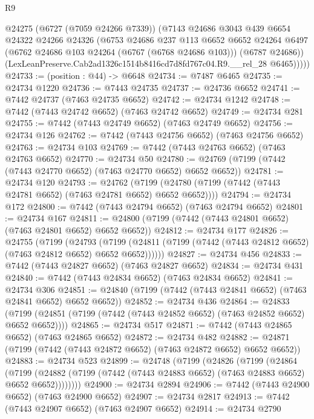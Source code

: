 \begin{lexlean}{R9}
\begin{coremodule}
          @24275
          (@6727 (@7059 @24266 @7339))
          (@7143
            @24686
            @3043
            @439
            @6654
            @24322
            @24266
            @24326
            (@6753
              @24686
              @237
              @113
              @6652
              @6652
              @24264
              @6497
              (@6762 @24686 @103 @24264 (@6767 (@6768 @24686 @103)))
              (@6787 @24686))
            (LexLeanPreserve.Cab2ad1326c1514b8416cd7d8fd767c04.R9.__rel_28 @6465)))))
@24733 := (position : @44) -> @6648
@24734 := @7487 @6465
@24735 := @24734 @1220
@24736 := @7443 @24735
@24737 := @24736 @6652
@24741 := @7442 @24737 (@7463 @24735 @6652)
@24742 := @24734 @1242
@24748 := @7442 (@7443 @24742 @6652) (@7463 @24742 @6652)
@24749 := @24734 @281
@24755 := @7442 (@7443 @24749 @6652) (@7463 @24749 @6652)
@24756 := @24734 @126
@24762 := @7442 (@7443 @24756 @6652) (@7463 @24756 @6652)
@24763 := @24734 @103
@24769 := @7442 (@7443 @24763 @6652) (@7463 @24763 @6652)
@24770 := @24734 @50
@24780 := @24769 (@7199 (@7442 (@7443 @24770 @6652) (@7463 @24770 @6652) @6652 @6652))
@24781 := @24734 @120
@24793 := @24762
    (@7199 (@24780 (@7199 (@7442 (@7443 @24781 @6652) (@7463 @24781 @6652) @6652 @6652))))
@24794 := @24734 @172
@24800 := @7442 (@7443 @24794 @6652) (@7463 @24794 @6652)
@24801 := @24734 @167
@24811 := @24800 (@7199 (@7442 (@7443 @24801 @6652) (@7463 @24801 @6652) @6652 @6652))
@24812 := @24734 @177
@24826 := @24755
    (@7199
      (@24793
        (@7199 (@24811 (@7199 (@7442 (@7443 @24812 @6652) (@7463 @24812 @6652) @6652 @6652))))))
@24827 := @24734 @456
@24833 := @7442 (@7443 @24827 @6652) (@7463 @24827 @6652)
@24834 := @24734 @431
@24840 := @7442 (@7443 @24834 @6652) (@7463 @24834 @6652)
@24841 := @24734 @306
@24851 := @24840 (@7199 (@7442 (@7443 @24841 @6652) (@7463 @24841 @6652) @6652 @6652))
@24852 := @24734 @436
@24864 := @24833
    (@7199 (@24851 (@7199 (@7442 (@7443 @24852 @6652) (@7463 @24852 @6652) @6652 @6652))))
@24865 := @24734 @517
@24871 := @7442 (@7443 @24865 @6652) (@7463 @24865 @6652)
@24872 := @24734 @482
@24882 := @24871 (@7199 (@7442 (@7443 @24872 @6652) (@7463 @24872 @6652) @6652 @6652))
@24883 := @24734 @523
@24899 := @24748
    (@7199
      (@24826
        (@7199
          (@24864
            (@7199
              (@24882 (@7199 (@7442 (@7443 @24883 @6652) (@7463 @24883 @6652) @6652 @6652))))))))
@24900 := @24734 @2894
@24906 := @7442 (@7443 @24900 @6652) (@7463 @24900 @6652)
@24907 := @24734 @2817
@24913 := @7442 (@7443 @24907 @6652) (@7463 @24907 @6652)
@24914 := @24734 @2790

\end{coremodule}
\end{lexlean}
